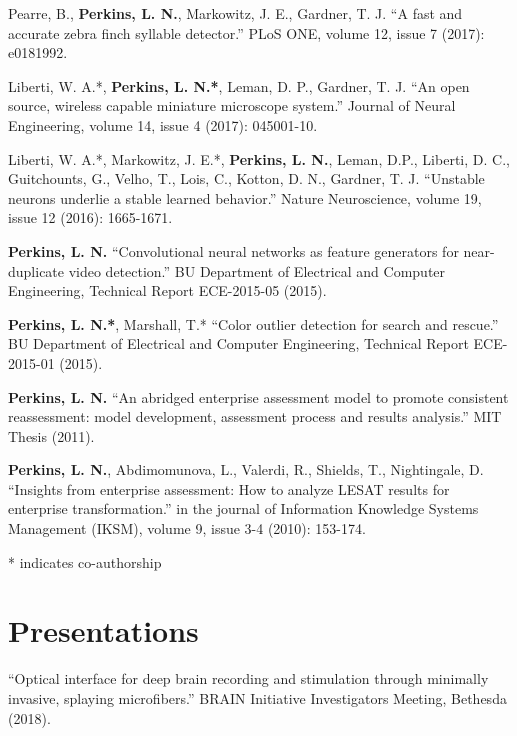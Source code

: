 \noindent
Pearre, B., \textbf{Perkins, L. N.}, Markowitz, J. E., Gardner, T. J. ``A fast and accurate zebra finch syllable detector.'' PLoS ONE, volume  12, issue 7 (2017): e0181992.

\bigskip

\noindent
Liberti, W. A.*, \textbf{Perkins, L. N.*}, Leman, D. P., Gardner, T. J. ``An open source, wireless capable miniature microscope system.'' Journal of Neural Engineering, volume 14, issue 4 (2017): 045001-10.

\bigskip

\noindent
Liberti, W. A.*, Markowitz, J. E.*, \textbf{Perkins, L. N.}, Leman, D.P., Liberti, D. C., Guitchounts, G., Velho, T., Lois, C., Kotton, D. N., Gardner, T. J. ``Unstable neurons underlie a stable learned behavior.'' Nature Neuroscience, volume 19, issue 12 (2016): 1665-1671.

\bigskip

\noindent
\textbf{Perkins, L. N.} ``Convolutional neural networks as feature generators for near-duplicate video detection.'' BU Department of Electrical and Computer Engineering, Technical Report ECE-2015-05 (2015).

\bigskip

\noindent
\textbf{Perkins, L. N.*}, Marshall, T.* ``Color outlier detection for search and rescue.'' BU Department of Electrical and Computer Engineering, Technical Report ECE-2015-01 (2015).

\bigskip

\noindent
\textbf{Perkins, L. N.} ``An abridged enterprise assessment model to promote consistent reassessment: model development, assessment process and results analysis.'' MIT Thesis (2011).

\bigskip

\noindent
\textbf{Perkins, L. N.}, Abdimomunova, L., Valerdi, R., Shields, T., Nightingale, D. ``Insights from enterprise assessment: How to analyze LESAT results for enterprise transformation.'' in the journal of Information Knowledge Systems Management (IKSM), volume 9, issue 3-4 (2010): 153-174.

\bigskip

\noindent
* indicates co-authorship

\section*{Presentations}

``Optical interface for deep brain recording and stimulation through minimally invasive, splaying microfibers.'' BRAIN Initiative Investigators Meeting, Bethesda (2018).

